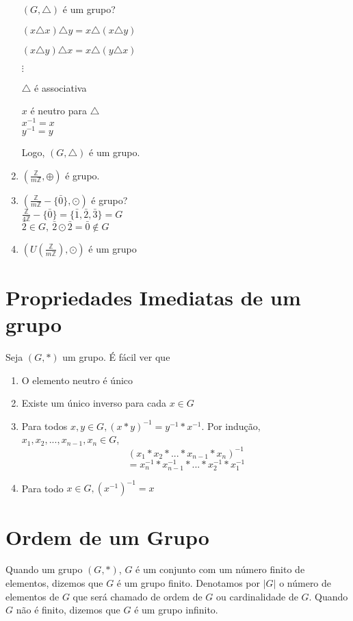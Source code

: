 \begin{enumerate}
$(G,\triangle)$ {\'e} um grupo?

$(x\triangle x)\triangle y= x\triangle(x\triangle y)$

$(x\triangle y)\triangle x=x\triangle(y\triangle x)$

$\vdots$

$\triangle$ {\'e} associativa

$x$ {\'e} neutro para $\triangle$\\
$x^{-1}=x$\\
$y^{-1}=y$

Logo, $(G,\triangle)$ {\'e} um grupo.
\item $\left(\displaystyle\frac{\mathbb{Z}}{m\mathbb{Z}},\oplus\right)$ {\'e} grupo.
\item $\left(\displaystyle\frac{\mathbb{Z}}{m\mathbb{Z}}-\{\bar{0}\},\odot\right)$ {\'e} grupo?\\
$\displaystyle\frac{\mathbb{Z}}{4\mathbb{Z}}-\{\bar{0}\}=\{\bar{1},\bar{2},\bar{3}\}=G$\\
$\bar{2}\in G,\ \bar{2}\odot\bar{2}=\bar{0}\notin G$
\item $\left(U\left(\displaystyle\frac{\mathbb{Z}}{m\mathbb{Z}}\right),\odot\right)$ {\'e} um grupo\\
\end{enumerate}

\section{Propriedades Imediatas de um grupo}

Seja $(G,*)$ um grupo. {\'E} f{\'a}cil ver que
\begin{enumerate}
\item O elemento neutro {\'e} {\'u}nico
\item Existe um {\'u}nico inverso para cada $x\in G$
\item Para todos $x,y\in G,(x*y)^{-1}=y^{-1}*x^{-1}$. Por indu{\c c}{\~a}o, $x_{1},x_{2},...,x_{n-1},x_{n}\in G$, \[(x_{1}*x_{2}*...*x_{n-1}*x_{n})^{-1}\] \[=x^{-1}_{n}*x^{-1}_{n-1}*...*x^{-1}_{2}*x^{-1}_{1}\]
\item Para todo $x\in G, (x^{-1})^{-1}=x$

\end{enumerate}

\section{Ordem de um Grupo}
\begin{definicao}
Quando um grupo $(G,*)$, $G$ {\'e} um conjunto com um n{\'u}mero finito de elementos, dizemos que $G$ {\'e} um grupo finito. Denotamos por $|G|$ o n{\'u}mero de elementos de $G$ que ser{\'a} chamado de ordem de $G$ ou cardinalidade de $G$. Quando $G$ n{\~a}o {\'e} finito, dizemos que $G$ {\'e} um grupo infinito.
\end{definicao}

